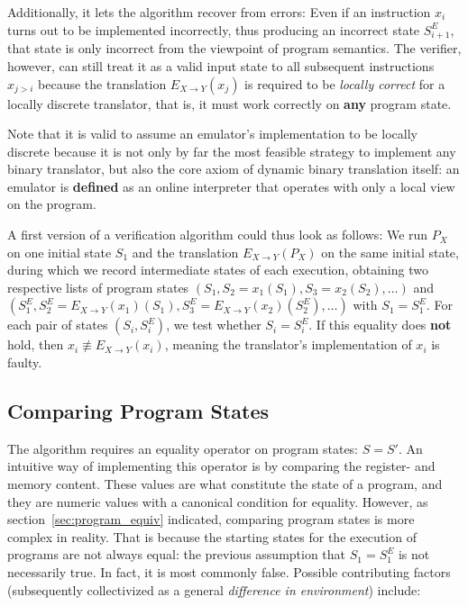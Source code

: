 Additionally, it lets the algorithm recover from errors: Even if an instruction $x_i$ turns out to be implemented
incorrectly, thus producing an incorrect state $S^E_{i+1}$, that state is only incorrect from the viewpoint of program
semantics. The verifier, however, can still treat it as a valid input state to all subsequent instructions $x_{j > i}$
because the translation $E_{X \rightarrow Y}(x_j)$ is required to be \textit{locally correct} for a locally discrete
translator, that is, it must work correctly on \textbf{any} program state.

Note that it is valid to assume an emulator's implementation to be locally discrete because it is not only by far the
most feasible strategy to implement any binary translator, but also the core axiom of dynamic binary translation itself:
an emulator is \textbf{defined} as an online interpreter that operates with only a local view on the program.

A first version of a verification algorithm could thus look as follows: We run $P_X$ on one initial state $S_1$ and the
translation $E_{X \rightarrow Y}(P_X)$ on the same initial state, during which we record intermediate states of each
execution, obtaining two respective lists of program states $(S_1, S_2 = x_1(S_1), S_3 = x_2(S_2), …)$ and $(S^E_1,
S^E_2 = E_{X \rightarrow Y}(x_1)(S_1), S^E_3 = E_{X \rightarrow Y}(x_2)(S^E_2), …)$ with $S_1 = S^E_1$. For each pair of
states $(S_i, S^E_i)$, we test whether $S_i = S^E_i$. If this equality does \textbf{not} hold, then $x_i \not\equiv E_{X
\rightarrow Y}(x_i)$, meaning the translator's implementation of $x_i$ is faulty.

\subsection{Comparing Program States}\label{sec:comparison}

The algorithm requires an equality operator on program states: $S = S'$. An intuitive way of implementing this operator
is by comparing the register- and memory content. These values are what constitute the state of a program, and they are
numeric values with a canonical condition for equality. However, as section~\ref{sec:program_equiv} indicated, comparing
program states is more complex in reality. That is because the starting states for the execution of programs are not
always equal: the previous assumption that $S_1 = S^E_1$ is not necessarily true. In fact, it is most commonly false.
Possible contributing factors (subsequently collectivized as a general \textit{difference in environment}) include:

